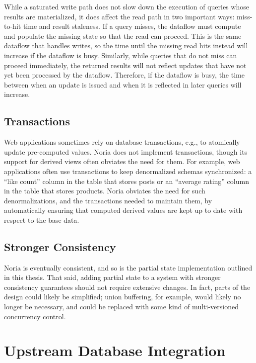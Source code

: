 While a saturated write path does not slow down the execution of queries whose
results are materialized, it does affect the read path in two important ways:
miss-to-hit time and result staleness. If a query misses, the dataflow must
compute and populate the missing state so that the read can proceed. This is the
same dataflow that handles writes, so the time until the missing read hits
instead will increase if the dataflow is busy. Similarly, while queries that do
not miss can proceed immediately, the returned results will not reflect updates
that have not yet been processed by the dataflow. Therefore, if the dataflow is
busy, the time between when an update is issued and when it is reflected in
later queries will increase.

\subsection{Transactions}

Web applications sometimes rely on database transactions, e.g., to atomically
update pre-computed values. Noria does not implement transactions, though its
support for derived views often obviates the need for them. For example, web
applications often use transactions to keep denormalized schemas synchronized: a
``like count'' column in the table that stores posts or an ``average rating''
column in the table that stores products. Noria obviates the need for such
denormalizations, and the transactions needed to maintain them, by automatically
ensuring that computed derived values are kept up to date with respect to the
base data.

\subsection{Stronger Consistency}

Noria is eventually consistent, and so is the partial state implementation
outlined in this thesis. That said, adding partial state to a system with
stronger consistency guarantees should not require extensive changes. In fact,
parts of the design could likely be simplified; union buffering, for example,
would likely no longer be necessary, and could be replaced with some kind of
multi-versioned concurrency control.

\section{Upstream Database Integration}

